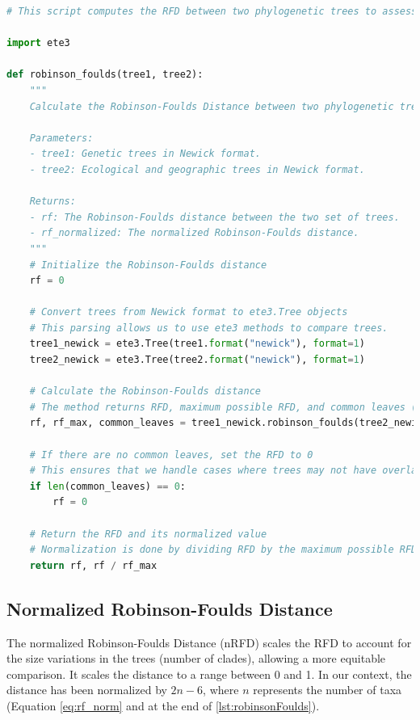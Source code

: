 \begin{lstlisting}[label=lst:robinsonFoulds,language=Python,caption=Python script for calculating the Robinson-Foulds Distance using the ete3 package in the aPhyloGeo package.]
# This script computes the RFD between two phylogenetic trees to assess their topological dissimilarity.

import ete3

def robinson_foulds(tree1, tree2):
    """
    Calculate the Robinson-Foulds Distance between two phylogenetic trees.

    Parameters:
    - tree1: Genetic trees in Newick format.
    - tree2: Ecological and geographic trees in Newick format.

    Returns:
    - rf: The Robinson-Foulds distance between the two set of trees.
    - rf_normalized: The normalized Robinson-Foulds distance.
    """
    # Initialize the Robinson-Foulds distance
    rf = 0

    # Convert trees from Newick format to ete3.Tree objects
    # This parsing allows us to use ete3 methods to compare trees.
    tree1_newick = ete3.Tree(tree1.format("newick"), format=1)
    tree2_newick = ete3.Tree(tree2.format("newick"), format=1)

    # Calculate the Robinson-Foulds distance
    # The method returns RFD, maximum possible RFD, and common leaves (i.e., taxa) between the trees.
    rf, rf_max, common_leaves = tree1_newick.robinson_foulds(tree2_newick, unrooted_trees=True)

    # If there are no common leaves, set the RFD to 0
    # This ensures that we handle cases where trees may not have overlapping taxa.
    if len(common_leaves) == 0:
        rf = 0

    # Return the RFD and its normalized value
    # Normalization is done by dividing RFD by the maximum possible RFD.
    return rf, rf / rf_max
\end{lstlisting}

\subsection{Normalized Robinson-Foulds Distance}\label{RFnorm}

The normalized Robinson-Foulds Distance (nRFD) scales the RFD to account for the size variations in the trees (number of clades), allowing a more equitable comparison. It scales the distance to a range between 0 and 1. In our context, the distance has been normalized by $2n-6$, where $n$ represents the number of taxa (Equation \eqref{eq:rf_norm} and at the end of \autoref{lst:robinsonFoulds}). 

